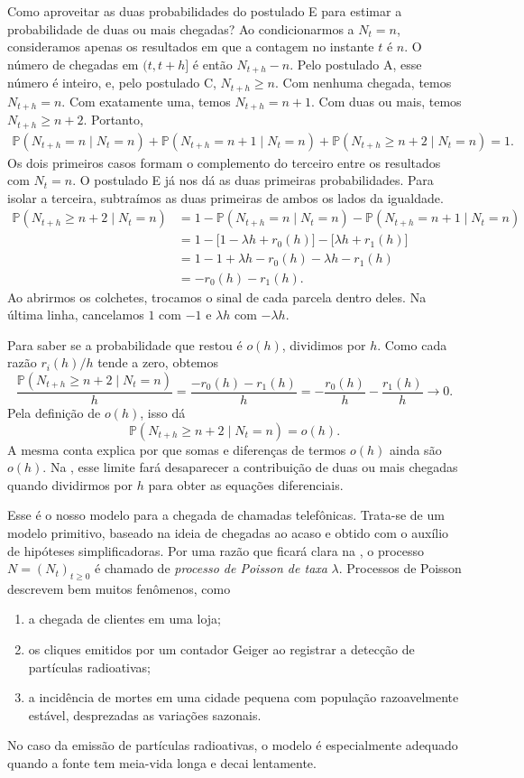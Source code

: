 \documentclass[12pt,portuguese]{article}
\theoremstyle{definition}
\theoremstyle{plainexercise}
\theoremstyle{starredexercise}
\theoremstyle{definition}
\begin{document}
Como aproveitar as duas probabilidades do postulado E para estimar a
probabilidade de duas ou mais chegadas? Ao condicionarmos a $N_t=n$,
consideramos apenas os resultados em que a contagem no instante $t$ é $n$.
O número de chegadas em $(t,t+h]$ é então $N_{t+h}-n$. Pelo postulado A,
esse número é inteiro, e, pelo postulado C, $N_{t+h}\geqslant n$.
Com nenhuma chegada, temos $N_{t+h}=n$. Com exatamente uma, temos
$N_{t+h}=n+1$. Com duas ou mais, temos $N_{t+h}\geqslant n+2$.
Portanto,
\begin{align*}
\mathbb{P}(N_{t+h}=n\mid N_t=n)
+\mathbb{P}(N_{t+h}=n+1\mid N_t=n)
+\mathbb{P}(N_{t+h}\geqslant n+2\mid N_t=n)=1.
\end{align*}
Os dois primeiros casos formam o complemento do terceiro entre os
resultados com $N_t=n$. O postulado E já nos dá as duas primeiras
probabilidades. Para isolar a terceira, subtraímos as duas primeiras
de ambos os lados da igualdade.
\begin{align*}
  \mathbb{P}(N_{t+h}\geqslant n+2\mid N_t=n)
  &=1-\mathbb{P}(N_{t+h}=n\mid N_t=n)
  -\mathbb{P}(N_{t+h}=n+1\mid N_t=n)\\
  &=1-\bigl[1-\lambda h+r_0(h)\bigr]-\bigl[\lambda h+r_1(h)\bigr]\\
  &=1-1+\lambda h-r_0(h)-\lambda h-r_1(h)\\
  &=-r_0(h)-r_1(h).
\end{align*}
Ao abrirmos os colchetes, trocamos o sinal de cada parcela dentro deles.
Na última linha, cancelamos $1$ com $-1$ e $\lambda h$
com $-\lambda h$.

Para saber se a probabilidade que restou é $o(h)$, dividimos por $h$.
Como cada razão $r_i(h)/h$ tende a zero, obtemos
\[
  \frac{\mathbb{P}(N_{t+h}\geqslant n+2\mid N_t=n)}{h}
  =\frac{-r_0(h)-r_1(h)}{h}
  =-\frac{r_0(h)}{h}-\frac{r_1(h)}{h}
  \longrightarrow 0.
\]
Pela definição de $o(h)$, isso dá
\[
  \mathbb{P}(N_{t+h}\geqslant n+2\mid N_t=n)=o(h).
\]
A mesma conta explica por que somas e diferenças de termos $o(h)$ ainda
são $o(h)$. Na , esse limite fará desaparecer a
contribuição de duas ou mais chegadas quando dividirmos por $h$ para
obter as equações diferenciais.

Esse é o nosso modelo para a chegada de chamadas telefônicas. Trata-se de um
modelo primitivo, baseado na ideia de chegadas ao acaso e obtido com o auxílio
de hipóteses simplificadoras. Por uma razão que ficará clara na
, o processo $N=(N_t)_{t\geqslant0}$ é chamado de
\emph{processo de Poisson de taxa} $\lambda$. Processos de Poisson descrevem
bem muitos fenômenos, como
\begin{enumerate}[label=\textnormal{(\alph*)}, itemsep=1pt]
  \item a chegada de clientes em uma loja;
  \item os cliques emitidos por um contador Geiger ao registrar a detecção de
        partículas radioativas;
  \item a incidência de mortes em uma cidade pequena com população
        razoavelmente estável, desprezadas as variações sazonais.
\end{enumerate}
No caso da emissão de partículas radioativas, o modelo é especialmente
adequado quando a fonte tem meia-vida longa e decai lentamente.
\end{document}
